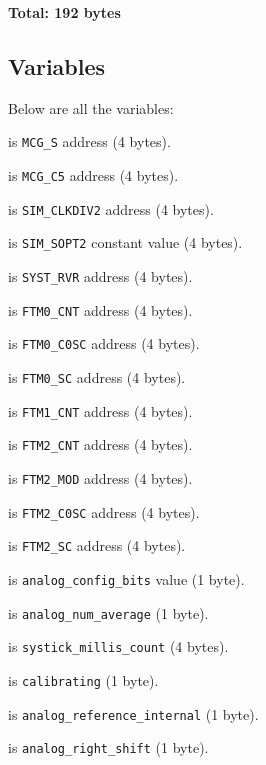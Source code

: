 \textbf{Total: 192 bytes}

\subsection{Variables}

Below are all the variables:

 is \texttt{MCG\_S} address (4 bytes).

 is \texttt{MCG\_C5} address (4 bytes).

 is \texttt{SIM\_CLKDIV2} address (4 bytes).

 is \texttt{SIM\_SOPT2} constant value (4 bytes).

 is \texttt{SYST\_RVR} address (4 bytes).

\vspace{1em}

 is \texttt{FTM0\_CNT} address (4 bytes).

 is \texttt{FTM0\_C0SC} address (4 bytes).

 is \texttt{FTM0\_SC} address (4 bytes).

 is \texttt{FTM1\_CNT} address (4 bytes).

 is \texttt{FTM2\_CNT} address (4 bytes).

 is \texttt{FTM2\_MOD} address (4 bytes).

 is \texttt{FTM2\_C0SC} address (4 bytes).

 is \texttt{FTM2\_SC} address (4 bytes).

\vspace{1em}

 is \texttt{analog\_config\_bits} value (1 byte).

 is \texttt{analog\_num\_average} (1 byte).

 is \texttt{systick\_millis\_count} (4 bytes).

 is \texttt{calibrating} (1 byte).

 is \texttt{analog\_reference\_internal} (1 byte).

 is \texttt{analog\_right\_shift} (1 byte).


